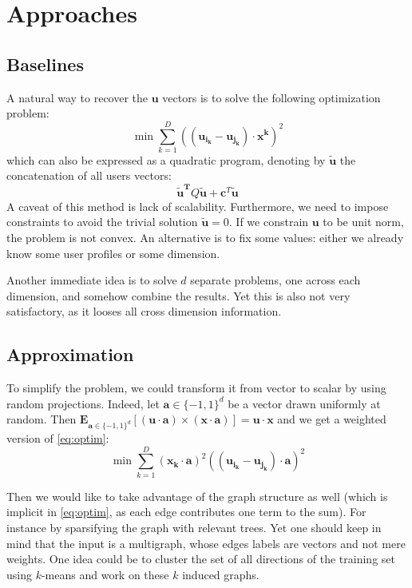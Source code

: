 \section{Approaches}

\subsection{Baselines}
A natural way to recover the $\bm{u}$ vectors is to solve the following
optimization problem:
\begin{equation}
	\min \sum_{k=1}^D \left( (\bm{u_{i_k}} - \bm{u_{j_k}} ) \cdot \bm{x^k} \right )^2
	\label{eq:optim}
\end{equation}
which can also be expressed as a quadratic program, denoting by $\bm{\tilde{u}}$ the
concatenation of all users vectors:
\begin{equation*}
	\bm{\tilde{u}^T} Q \bm{\tilde{u}} + \bm{c}^T \bm{\tilde{u}}
\end{equation*}
A caveat of this method is lack of scalability. Furthermore, we need to impose
constraints to avoid the trivial solution $\bm{\tilde{u}} = 0$. If we constrain
$\bm{u}$ to be unit norm, the problem is not convex. An alternative is to fix
some values: either we already know some user profiles or some dimension.

Another immediate idea is to solve $d$ separate problems, one across each
dimension, and somehow combine the results. Yet this is also not very
satisfactory, as it looses all cross dimension information.

\subsection{Approximation}

To simplify the problem, we could transform it from vector to scalar by using
random projections. Indeed, let $\bm{a} \in \{-1,1\}^d$ be a vector drawn uniformly
at random. Then $\mathbf{E}_{\bm{a} \in \{-1,1\}^d}\left[(\bm{u}\cdot \bm{a})\times
(\bm{x} \cdot \bm{a})\right] = \bm{u}\cdot \bm{x}$ and we get a weighted
version of \eqref{eq:optim}:
\begin{equation*}
	\min \sum_{k=1}^D (\bm{x_k}\cdot \bm{a})^2
	\left( (\bm{u_{i_k}} - \bm{u_{j_k}} ) \cdot \bm{a} \right )^2
	\label{eq:random-optim}
\end{equation*}

Then we would like to take advantage of the graph structure as well (which is
implicit in \eqref{eq:optim}, as each edge contributes one term to the sum).
For instance by sparsifying the graph with relevant trees. Yet one should keep
in mind that the input is a multigraph, whose edges labels are vectors and not
mere weights. One idea could be to cluster the set of all directions of the
training set using $k$-means and work on these $k$ induced graphs.

